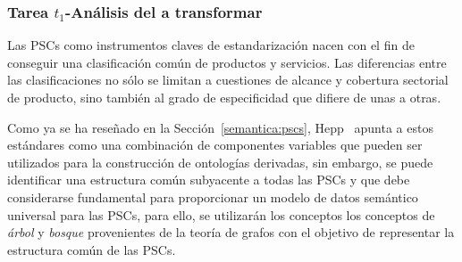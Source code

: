 \subsubsection{Tarea $t_1$-Análisis del \dataset a transformar}\label{t1-pscs}
Las \gls{PSC}s como instrumentos claves de estandarización nacen con el fin de
conseguir una clasificación común de productos y servicios. Las diferencias entre las clasificaciones no
sólo se limitan a cuestiones de alcance y cobertura sectorial de producto, sino también al grado de especificidad que difiere de unas a otras.

Como ya se ha reseñado en la Sección~\ref{semantica:pscs}, Hepp~\cite{HeppTrueComplexity,HeppEclass,HeppMethodology} apunta 
a estos estándares como una combinación de componentes variables que pueden ser utilizados 
para la construcción de ontologías derivadas, sin embargo, se puede identificar 
una estructura común subyacente a todas las PSCs y que debe considerarse fundamental para 
proporcionar un modelo de datos semántico universal para las PSCs, para ello, se utilizarán 
los conceptos los conceptos de \textit{árbol} y \textit{bosque} provenientes de la teoría de 
grafos con el objetivo de representar la estructura común de las PSCs. 

